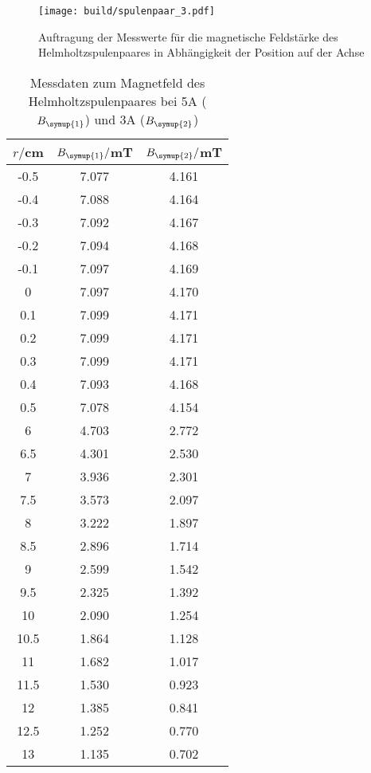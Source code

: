 \begin{figure}
  \centering
  \texttt{[image: build/spulenpaar\_3.pdf]}
  \caption{Auftragung der Messwerte für die magnetische Feldstärke des Helmholtzspulenpaares
  in Abhängigkeit der Position auf der Achse}
  \label{fig:spulenpaar_3}
\end{figure}






\begin{table}
  \centering
  \caption{Messdaten zum Magnetfeld des Helmholtzspulenpaares bei 5A ($B_{\symup{1}}$)
  und 3A ($B_{\symup{2}}$)}
  \label{tab:helmholtz}
  \begin{tabular}{c c c}
    \toprule
    $r/$cm & $B_{\symup{1}}/$mT & $B_{\symup{2}}/$mT\\
    \midrule
    -0.5	&  7.077 & 4.161\\
    -0.4	&  7.088 & 4.164\\
    -0.3	&  7.092 & 4.167\\
    -0.2	&  7.094 & 4.168\\
    -0.1	&  7.097 & 4.169\\
    0	    &  7.097 & 4.170\\
    0.1	  &  7.099 & 4.171\\
    0.2	  &  7.099 & 4.171\\
    0.3	  &  7.099 & 4.171\\
    0.4	  &  7.093 & 4.168\\
    0.5	  &  7.078 & 4.154\\
    6	    &  4.703 & 2.772\\
    6.5	  &  4.301 & 2.530\\
    7	    &  3.936 & 2.301\\
    7.5	  &  3.573 & 2.097\\
    8	    &  3.222 & 1.897\\
    8.5	  &  2.896 & 1.714\\
    9	    &  2.599 & 1.542\\
    9.5 	&  2.325 & 1.392\\
    10	  &  2.090 & 1.254\\
    10.5	&  1.864 & 1.128\\
    11	  &  1.682 & 1.017\\
    11.5	&  1.530 & 0.923\\
    12	  &  1.385 & 0.841\\
    12.5	&  1.252 & 0.770\\
    13	  &  1.135 & 0.702\\

\end{tabular}
\end{table}
